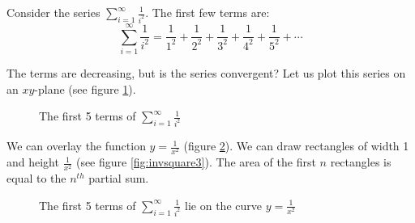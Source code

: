 Consider the series $\sum_{i = 1}^\infty \frac{1}{i^2}$. The first few terms 
are:
$$\sum_{i = 1}^\infty \frac{1}{i^2} = \frac{1}{1^2} + \frac{1}{2^2} + 
\frac{1}{3^2} + \frac{1}{4^2} + \frac{1}{5^2} + \cdots$$

The terms are decreasing, but is the series convergent? Let us plot this series on an 
$xy$-plane (see figure \ref{fig:invsquare1}). 

\begin{figure}[H]
    \centering
    \caption{The first 5 terms of $\sum_{i = 1}^\infty \frac{1}{i^2}$}
    \label{fig:invsquare1}
\end{figure}

We can overlay the function $y = \frac{1}{x^2}$ (figure \ref{fig:invsquare2}). 
We can draw rectangles of width 1 and height $\frac{1}{x^2}$ (see figure 
\ref{fig:invsquare3}). The area of the first $n$ rectangles is equal to the 
$n^{th}$ partial sum. 

\begin{figure}[H]
    \centering
    \caption{The first 5 terms of $\sum_{i = 1}^\infty \frac{1}{i^2}$ lie on
    the curve $y = \frac{1}{x^2}$}
    \label{fig:invsquare2}
\end{figure}

